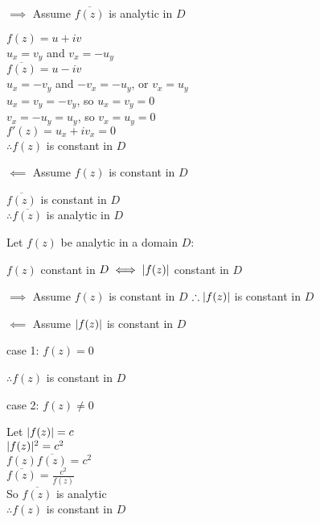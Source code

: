 \documentclass[letterpaper,12pt,fleqn]{article}
\newcommand{\conj}[1]{\overline{#1}}
\begin{document}
\begin{theproof}
  \listbreak
  \begin{description}
  \item $\implies$ Assume $\conj{f(z)}$ is analytic in $D$

    $f(z)=u+iv$ \\
    $u_x=v_y$ and $v_x=-u_y$ \\
    $\conj{f(z)}=u-iv$ \\
    $u_x=-v_y$ and $-v_x=-u_y$, or $v_x=u_y$ \\
    $u_x=v_y=-v_y$, so $u_x=v_y=0$ \\
    $v_x=-u_y=u_y$, so $v_x=u_y=0$ \\
    $f'(z)=u_x+iv_x=0$ \\
    $\therefore f(z)$ is constant in $D$
\newpage    
  \item $\impliedby$ Assume $f(z)$ is constant in $D$
    
    $\conj{f(z)}$ is constant in $D$ \\
    $\therefore\conj{f(z)}$ is analytic in $D$
  \end{description}
\end{theproof}

\begin{theorem}
  Let $f(z)$ be analytic in a domain $D$:

  $f(z)$ constant in $D\iff\lvert f(z)\rvert$ constant in $D$
\end{theorem}

\begin{theproof}
  \listbreak
  \begin{description}
  \item $\implies$ Assume $f(z)$ is constant in $D$
    $\therefore \lvert f(z)\rvert$ is constant in $D$

  \item $\impliedby$ Assume $\lvert f(z)\rvert$ is constant in $D$
    
    \begin{description}
    \item case 1: $f(z)=0$

      $\therefore f(z)$ is constant in $D$

    \item case 2: $f(z)\ne0$
      
      Let $\lvert f(z)\rvert=c$ \\
      $\lvert f(z)\rvert^2=c^2$ \\
      $f(z)\conj{f(z)}=c^2$ \\
      $\conj{f(z)}=\frac{c^2}{f(z)}$ \\
      So $\conj{f(z)}$ is analytic \\
      $\therefore f(z)$ is constant in $D$
    \end{description}
  \end{description}
\end{theproof}
\end{document}
